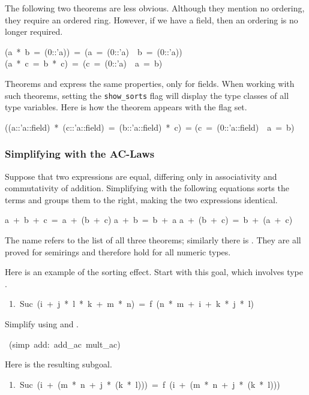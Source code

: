 The following two theorems are less obvious. Although they
mention no ordering, they require an ordered ring. However, if we have a 
field, then an ordering is no longer required.
\begin{isabelle}
(a\ *\ b\ =\ (0::'a))\ =\ (a\ =\ (0::'a)\ \isasymor \ b\ =\ (0::'a))
\isanewline
(a\ *\ c\ =\ b\ *\ c)\ =\ (c\ =\ (0::'a)\ \isasymor \ a\ =\ b)
\end{isabelle}
Theorems  and 
express the same properties, only for fields. When working with such
theorems, setting the \texttt{show_sorts}
flag will display the type classes of all type variables. Here is how the 
theorem  appears with the flag set.
\begin{isabelle}
((a::'a::field)\ *\ (c::'a::field)\ =\ (b::'a::field)\ *\ c)\ =\isanewline
(c\ =\ (0::'a::field)\ \isasymor \ a\ =\ b)
\end{isabelle}


\subsubsection{Simplifying with the AC-Laws}
Suppose that two expressions are equal, differing only in 
associativity and commutativity of addition.  Simplifying with the
following equations sorts the terms and groups them to the right, making
the two expressions identical.
\begin{isabelle}
a\ +\ b\ +\ c\ =\ a\ +\ (b\ +\ c)
\isanewline
a\ +\ b\ =\ b\ +\ a%
\isanewline
a\ +\ (b\ +\ c)\ =\ b\ +\ (a\ +\ c)
\end{isabelle}
The name  
refers to the list of all three theorems; similarly
there is . 
They are all proved for semirings and therefore hold for all numeric types.

Here is an example of the sorting effect.  Start
with this goal, which involves type .
\begin{isabelle}
\ 1.\ Suc\ (i\ +\ j\ *\ l\ *\ k\ +\ m\ *\ n)\ =\
f\ (n\ *\ m\ +\ i\ +\ k\ *\ j\ *\ l)
\end{isabelle}
%
Simplify using   and .
\begin{isabelle}
\ (simp\ add:\ add_ac\ mult_ac)
\end{isabelle}
%
Here is the resulting subgoal.
\begin{isabelle}
\ 1.\ Suc\ (i\ +\ (m\ *\ n\ +\ j\ *\ (k\ *\ l)))\
=\ f\ (i\ +\ (m\ *\ n\ +\ j\ *\ (k\ *\ l)))%
\end{isabelle}



